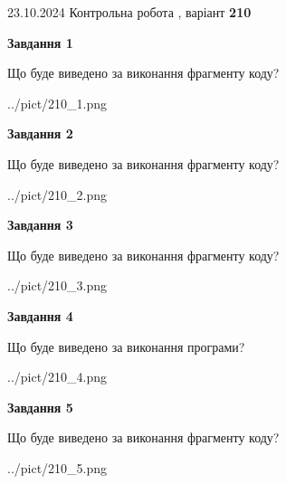 \documentclass[12pt, ukrainian]{article}
\begin{document}
{\Large{23.10.2024 Контрольна робота , варіант  \No \textbf { 210 }\par}}
{
\begin {large}
{\begin {center}\textbf{Завдання 1}\end {center}}

Що буде виведено за виконання фрагменту коду?\par
\begin{center}
	{../pict/210_1.png}
\end{center}
\newpage

{\begin {center}\textbf{Завдання 2}\end {center}}

Що буде виведено за виконання фрагменту коду?\par
\begin{center}
	{../pict/210_2.png}
\end{center}
\newpage

{\begin {center}\textbf{Завдання 3}\end {center}}

Що буде виведено за виконання фрагменту коду?\par
\begin{center}
	{../pict/210_3.png}
\end{center}
\newpage

{\begin {center}\textbf{Завдання 4}\end {center}}

Що буде виведено за виконання програми?\par
\begin{center}
	{../pict/210_4.png}
\end{center}
\newpage

{\begin {center}\textbf{Завдання 5}\end {center}}

Що буде виведено за виконання фрагменту коду?\par
\begin{center}
	{../pict/210_5.png}
\end{center}
\newpage


\end{large}}
\end{document}
